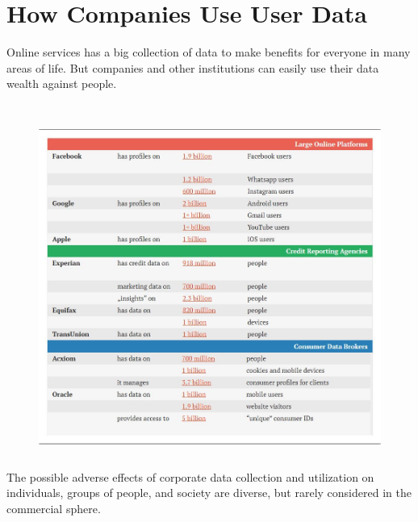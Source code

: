 \documentclass[12pt,a4paper,conference]{IEEEtran}
\begin{document}
\section{How Companies Use User Data}
Online services has a big collection of data to make benefits for everyone in many areas of life. But 
companies and other institutions can easily use their data wealth against people.\\
\\
\begin{figure}[h!]
 \includegraphics[height=11cm,width=\linewidth]{Capture.jpg}
\end{figure}
 The possible adverse effects of corporate data collection and utilization on individuals, groups of people, and society are diverse, but rarely considered in the commercial sphere. \\
\end{document}
